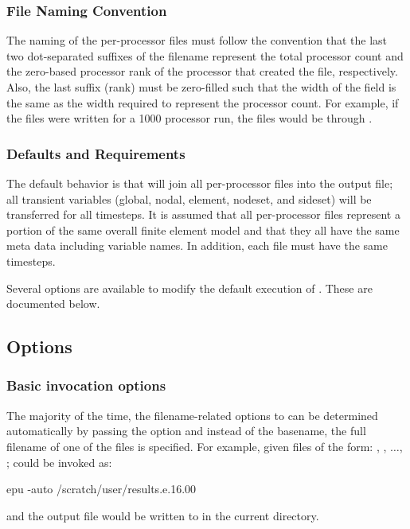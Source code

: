 \subsubsection{File Naming Convention}
The naming of the per-processor files must follow the convention that
the last two dot-separated suffixes of the filename represent the
total processor count and the zero-based processor rank of the
processor that created the file, respectively.  Also, the last suffix
(rank) must be zero-filled such that the width of the field is the
same as the width required to represent the processor count.  For
example, if the files were written for a 1000 processor run, the files
would be  through
. 

\subsubsection{Defaults and Requirements}
The default behavior is that \epu{} will join all per-processor files
into the output file; all transient variables (global, nodal, element,
nodeset, and sideset) will be transferred for all timesteps.  It is
assumed that all per-processor files represent a portion of the same
overall finite element model and that they all have the same \exo{}
meta data including variable names.  In addition, each file must have
the same timesteps.

Several options are available to modify the default execution of
\epu{}. These are documented below.

\subsection{Options}

\subsubsection{Basic invocation options}
The majority of the time, the filename-related options to \epu{} can
be determined automatically by passing the  option and
instead of the basename, the full filename of one of the
files is specified. For example, given files of the form:
,
, $\ldots$,
; \epu{} could be invoked
as:
\begin{syntax}
	epu -auto /scratch/user/results.e.16.00
\end{syntax}
and the output file would be written to  in the
current directory. 

